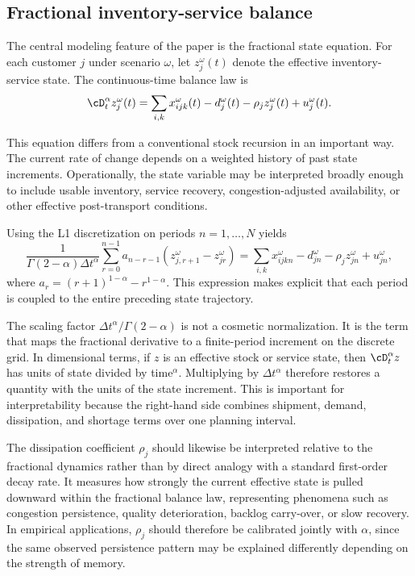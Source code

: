 \subsection{Fractional inventory-service balance}
The central modeling feature of the paper is the fractional state equation. For each customer $j$ under scenario $\omega$, let $z_j^{\omega}(t)$ denote the effective inventory-service state. The continuous-time balance law is
\begin{equation}\label{eq:fracbalance}
\cD_t^{\alpha} z_j^{\omega}(t)
=\sum_{i,k}x_{ijk}^{\omega}(t)-d_j^{\omega}(t)-\rho_j z_j^{\omega}(t)+u_j^{\omega}(t).
\end{equation}

This equation differs from a conventional stock recursion in an important way. The current rate of change depends on a weighted history of past state increments. Operationally, the state variable may be interpreted broadly enough to include usable inventory, service recovery, congestion-adjusted availability, or other effective post-transport conditions.

Using the L1 discretization on periods $n=1,\dots,N$ yields
\begin{equation}
\frac{1}{\Gamma(2-\alpha)\Delta t^{\alpha}}
\sum_{r=0}^{n-1}a_{n-r-1}(z_{j,r+1}^{\omega}-z_{jr}^{\omega})
=\sum_{i,k}x_{ijkn}^{\omega}-d_{jn}^{\omega}-\rho_j z_{jn}^{\omega}+u_{jn}^{\omega},
\end{equation}
where $a_r=(r+1)^{1-\alpha}-r^{1-\alpha}$. This expression makes explicit that each period is coupled to the entire preceding state trajectory.

The scaling factor $\Delta t^{\alpha}/\Gamma(2-\alpha)$ is not a cosmetic normalization. It is the term that maps the fractional derivative to a finite-period increment on the discrete grid. In dimensional terms, if $z$ is an effective stock or service state, then $\cD_t^{\alpha} z$ has units of state divided by time$^{\alpha}$. Multiplying by $\Delta t^{\alpha}$ therefore restores a quantity with the units of the state increment. This is important for interpretability because the right-hand side combines shipment, demand, dissipation, and shortage terms over one planning interval.

The dissipation coefficient $\rho_j$ should likewise be interpreted relative to the fractional dynamics rather than by direct analogy with a standard first-order decay rate. It measures how strongly the current effective state is pulled downward within the fractional balance law, representing phenomena such as congestion persistence, quality deterioration, backlog carry-over, or slow recovery. In empirical applications, $\rho_j$ should therefore be calibrated jointly with $\alpha$, since the same observed persistence pattern may be explained differently depending on the strength of memory.

